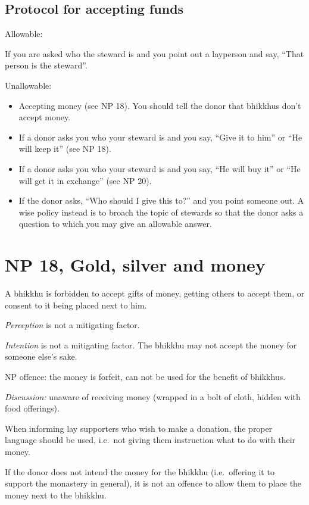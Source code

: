 \subsection{Protocol for accepting funds}

Allowable:

If you are asked who the steward is and you point out a layperson and
say, ``That person is the steward''.

Unallowable:

\begin{itemize}
\tightlist
\item
  Accepting money (see NP 18). You should tell the donor that bhikkhus
  don't accept money.
\item
  If a donor asks you who your steward is and you say, ``Give it to
  him'' or ``He will keep it'' (see NP 18).
\item
  If a donor asks you who your steward is and you say, ``He will buy
  it'' or ``He will get it in exchange'' (see NP 20).
\item
  If the donor asks, ``Who should I give this to?'' and you point
  someone out. A wise policy instead is to broach the topic of stewards
  so that the donor asks a question to which you may give an allowable
  answer.
\end{itemize}

\section{NP 18, Gold, silver and money}

A bhikkhu is forbidden to accept gifts of money, getting others to
accept them, or consent to it being placed next to him.

\emph{Perception} is not a mitigating factor.

\emph{Intention} is not a mitigating factor. The bhikkhu may not accept
the money for someone else's sake.

NP offence: the money is forfeit, can not be used for the benefit of
bhikkhus.

\emph{Discussion:} unaware of receiving money (wrapped in a bolt of
cloth, hidden with food offerings).

When informing lay supporters who wish to make a donation, the proper
language should be used, i.e.~not giving them instruction what to do
with their money.

If the donor does not intend the money for the bhikkhu (i.e.~offering it
to support the monastery in general), it is not an offence to allow them
to place the money next to the bhikkhu.


